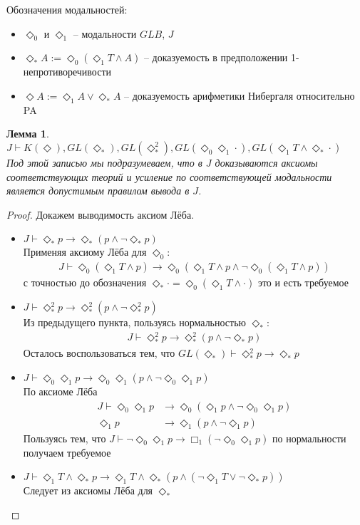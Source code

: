 \documentclass[12pt,a4paper,oneside]{article}
\newtheorem{lemma}{Лемма}
\begin{document}
Обозначения модальностей:
\begin{itemize}
\item $\Diamond_0 $ и $\Diamond_1 $ -- модальности $GLB$, $J$
\item $\Diamond_* A := \Diamond_0 (\Diamond_1 T \wedge  A)$ -- доказуемость в предположении 1-непротиворечивости
\item $\Diamond A  := \Diamond_1 A \vee  \Diamond_* A$ -- доказуемость арифметики Нибергаля относительно PA
\end{itemize}

\begin{lemma}
$J \vdash  K(\Diamond ), GL(\Diamond_* ), GL(\Diamond_* ^2), GL(\Diamond_0 \Diamond_1 \cdot), GL(\Diamond_1 T \wedge  \Diamond_* \cdot)$\\
Под этой записью мы подразумеваем, что в $J$ доказываются аксиомы соответствующих теорий
и усиление по соответствующей модальности является допустимым правилом вывода в $J$.
\end{lemma}
\begin{proof}
Докажем выводимость аксиом Лёба. 
\begin{itemize}
\item $J \vdash  \Diamond_* p \rightarrow  \Diamond_* (p \wedge  \neg \Diamond_* p)$\\
Применяя аксиому Лёба для $\Diamond_0 $:
\begin{align*}
J \vdash  \Diamond_0 (\Diamond_1 T \wedge  p) \rightarrow  \Diamond_0 (\Diamond_1 T \wedge  p \wedge  \neg \Diamond_0 (\Diamond_1 T \wedge  p))
\end{align*}
с точностью до обозначения $\Diamond_* \cdot = \Diamond_0 (\Diamond_1 T \wedge  \cdot)$ это и есть требуемое
\item $J \vdash  \Diamond_* ^2 p \rightarrow  \Diamond_* ^2(p \wedge  \neg \Diamond_* ^2 p)$\\
Из предыдущего пункта, пользуясь нормальностью $\Diamond_* $:
\begin{align*}
J \vdash  \Diamond_* ^2 p \rightarrow  \Diamond_* ^2(p \wedge  \neg \Diamond_* p)
\end{align*}
Осталось воспользоваться тем, что $GL(\Diamond_* ) \vdash  \Diamond_* ^2 p \rightarrow  \Diamond_* p$
\item $J \vdash  \Diamond_0 \Diamond_1 p \rightarrow  \Diamond_0 \Diamond_1 (p \wedge  \neg \Diamond_0 \Diamond_1 p)$\\
По аксиоме Лёба
\begin{align*}
J \vdash  \Diamond_0 \Diamond_1 p &\rightarrow  \Diamond_0 (\Diamond_1 p \wedge  \neg \Diamond_0 \Diamond_1 p)\\
\Diamond_1 p &\rightarrow  \Diamond_1 (p \wedge  \neg \Diamond_1 p)
\end{align*}
Пользуясь тем, что $J \vdash  \neg \Diamond_0 \Diamond_1 p \rightarrow  \Box_1 (\neg \Diamond_0 \Diamond_1 p)$ по нормальности получаем требуемое
\item $J \vdash  \Diamond_1 T \wedge  \Diamond_* p \rightarrow  \Diamond_1 T \wedge  \Diamond_* (p \wedge  (\neg \Diamond_1 T \vee  \neg \Diamond_* p))$\\
Следует из аксиомы Лёба для $\Diamond_* $
\end{itemize}
\end{proof}
\end{document}
